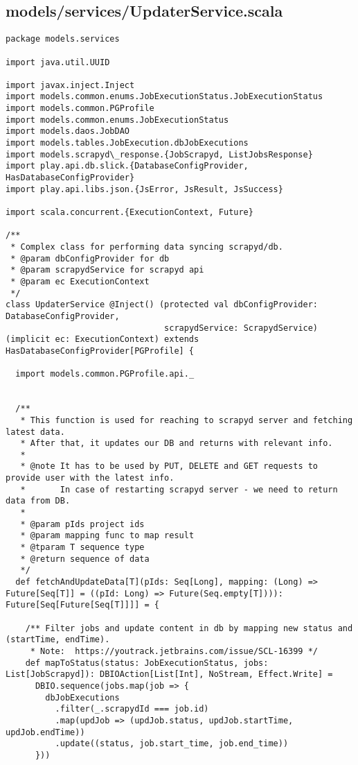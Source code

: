 \subsection{models/services/UpdaterService.scala}
\begin{lstlisting}
package models.services

import java.util.UUID

import javax.inject.Inject
import models.common.enums.JobExecutionStatus.JobExecutionStatus
import models.common.PGProfile
import models.common.enums.JobExecutionStatus
import models.daos.JobDAO
import models.tables.JobExecution.dbJobExecutions
import models.scrapyd\_response.{JobScrapyd, ListJobsResponse}
import play.api.db.slick.{DatabaseConfigProvider, HasDatabaseConfigProvider}
import play.api.libs.json.{JsError, JsResult, JsSuccess}

import scala.concurrent.{ExecutionContext, Future}

/**
 * Complex class for performing data syncing scrapyd/db.
 * @param dbConfigProvider for db
 * @param scrapydService for scrapyd api
 * @param ec ExecutionContext
 */
class UpdaterService @Inject() (protected val dbConfigProvider: DatabaseConfigProvider,
                                scrapydService: ScrapydService)(implicit ec: ExecutionContext) extends HasDatabaseConfigProvider[PGProfile] {

  import models.common.PGProfile.api._


  /**
   * This function is used for reaching to scrapyd server and fetching latest data.
   * After that, it updates our DB and returns with relevant info.
   *
   * @note It has to be used by PUT, DELETE and GET requests to provide user with the latest info.
   *       In case of restarting scrapyd server - we need to return data from DB.
   *
   * @param pIds project ids
   * @param mapping func to map result
   * @tparam T sequence type
   * @return sequence of data
   */
  def fetchAndUpdateData[T](pIds: Seq[Long], mapping: (Long) => Future[Seq[T]] = ((pId: Long) => Future(Seq.empty[T]))): Future[Seq[Future[Seq[T]]]] = {

    /** Filter jobs and update content in db by mapping new status and (startTime, endTime).
     * Note:  https://youtrack.jetbrains.com/issue/SCL-16399 */
    def mapToStatus(status: JobExecutionStatus, jobs: List[JobScrapyd]): DBIOAction[List[Int], NoStream, Effect.Write] =
      DBIO.sequence(jobs.map(job => {
        dbJobExecutions
          .filter(_.scrapydId === job.id)
          .map(updJob => (updJob.status, updJob.startTime, updJob.endTime))
          .update((status, job.start_time, job.end_time))
      }))


\end{lstlisting}
